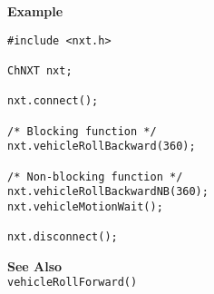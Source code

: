 \noindent
{\bf Example}
\begin{verbatim}
#include <nxt.h>

ChNXT nxt;

nxt.connect();

/* Blocking function */
nxt.vehicleRollBackward(360);

/* Non-blocking function */
nxt.vehicleRollBackwardNB(360);
nxt.vehicleMotionWait();

nxt.disconnect();
\end{verbatim}

\noindent
{\bf See Also}\\
\texttt{vehicleRollForward()}

